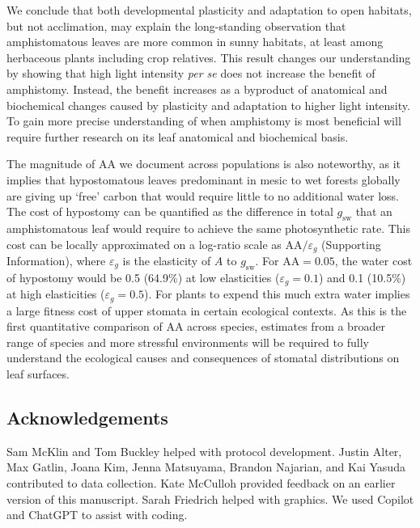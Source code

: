 \documentclass[
  letterpaper,
  DIV=11,
  numbers=noendperiod]{scrartcl}
\newcommand{\aax}{$\mathrm{AA}$}
\newcommand{\gsw}{$g_\text{sw}$}
\begin{document}
\begin{linenumbers}
\begin{doublespace}
\begin{figure}
\end{figure}%

We conclude that both developmental plasticity and adaptation to open
habitats, but not acclimation, may explain the long-standing observation
that amphistomatous leaves are more common in sunny habitats, at least
among herbaceous plants including crop relatives. This result changes
our understanding by showing that high light intensity \emph{per se}
does not increase the benefit of amphistomy. Instead, the benefit
increases as a byproduct of anatomical and biochemical changes caused by
plasticity and adaptation to higher light intensity. To gain more
precise understanding of when amphistomy is most beneficial will require
further research on its leaf anatomical and biochemical basis.

The magnitude of \aax{} we document across populations is also
noteworthy, as it implies that hypostomatous leaves predominant in mesic
to wet forests globally are giving up `free' carbon that would require
little to no additional water loss. The cost of hypostomy can be
quantified as the difference in total \gsw{} that an amphistomatous leaf
would require to achieve the same photosynthetic rate. This cost can be
locally approximated on a log-ratio scale as
\(\mathrm{AA} / \varepsilon_g\) (Supporting Information), where
\(\varepsilon_g\) is the elasticity of \(A\) to \gsw. For
\(\mathrm{AA} = 0.05\), the water cost of hypostomy would be 0.5
(64.9\%) at low elasticities (\(\varepsilon_g = 0.1\)) and 0.1 (10.5\%)
at high elasticities (\(\varepsilon_g = 0.5\)). For plants to expend
this much extra water implies a large fitness cost of upper stomata in
certain ecological contexts. As this is the first quantitative
comparison of \aax{} across species, estimates from a broader range of
species and more stressful environments will be required to fully
understand the ecological causes and consequences of stomatal
distributions on leaf surfaces.

\subsection{Acknowledgements}\label{acknowledgements}

Sam McKlin and Tom Buckley helped with protocol development. Justin
Alter, Max Gatlin, Joana Kim, Jenna Matsuyama, Brandon Najarian, and Kai
Yasuda contributed to data collection. Kate McCulloh provided feedback
on an earlier version of this manuscript. Sarah Friedrich helped with
graphics. We used Copilot and ChatGPT to assist with coding.


\end{doublespace}
\end{linenumbers}
\end{document}
